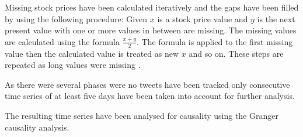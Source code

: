 \begin{description}
    Missing stock prices have been calculated iteratively and the gaps have been filled by using the following procedure:
    Given $x$ is a stock price value and $y$ is the next present value with one or more values in between are missing.
    The missing values are calculated using the formula $\frac{x+y}{2}$.
    The formula is applied to the first missing value then the calculated value is treated as new $x$ and so on.
    These steps are repeated as long values were missing
    \cite{Pagolu2016a}.

    As there were several phases were no tweets have been tracked only consecutive time series of at least five days have been taken into account for further analysis.

    The resulting time series have been analysed for causality using the Granger causality analysis.

\end{description}
